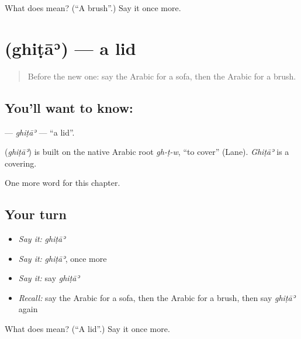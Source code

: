 \begin{tcolorbox}[breakable,colback=teal!4,colframe=teal!35!black,title={Before you move on}]
What does  mean? (\textquotedblleft{}A brush\textquotedblright{}.) Say it once more.
\end{tcolorbox}
\section[\texorpdfstring{\ar{غطاء} (ghiṭāʾ)}{غطاء (ghiṭāʾ)}]{ (ghiṭāʾ) — a lid}

\label{lesson:AR-C213-ghita}



\begin{quote}
Before the new one: say the Arabic for a sofa, then the Arabic for a brush.
\end{quote}

\subsection*{You'll want to know: }
\textbf{} — \emph{ghiṭāʾ} — \textquotedblleft{}a lid\textquotedblright{}.

\begin{cousinweb}
\textbf{} (\emph{ghiṭāʾ}) is built on the native Arabic root \emph{gh-ṭ-w}, \textquotedblleft{}to cover\textquotedblright{} (Lane). \emph{Ghiṭāʾ} is a covering.
\end{cousinweb}

\begin{grammarlens}[title={What you've built}]
One more word for this chapter.
\end{grammarlens}

\subsection*{Your turn}
\begin{itemize}
\raggedright
  \item \emph{Say it:} \emph{ghiṭāʾ}
  \item \emph{Say it:} \emph{ghiṭāʾ}, once more
  \item \emph{Say it:} say \emph{ghiṭāʾ}
  \item \emph{Recall:} say the Arabic for a sofa, then the Arabic for a brush, then say \emph{ghiṭāʾ} again
\end{itemize}

\begin{tcolorbox}[breakable,colback=teal!4,colframe=teal!35!black,title={Before you move on}]
What does  mean? (\textquotedblleft{}A lid\textquotedblright{}.) Say it once more.
\end{tcolorbox}
